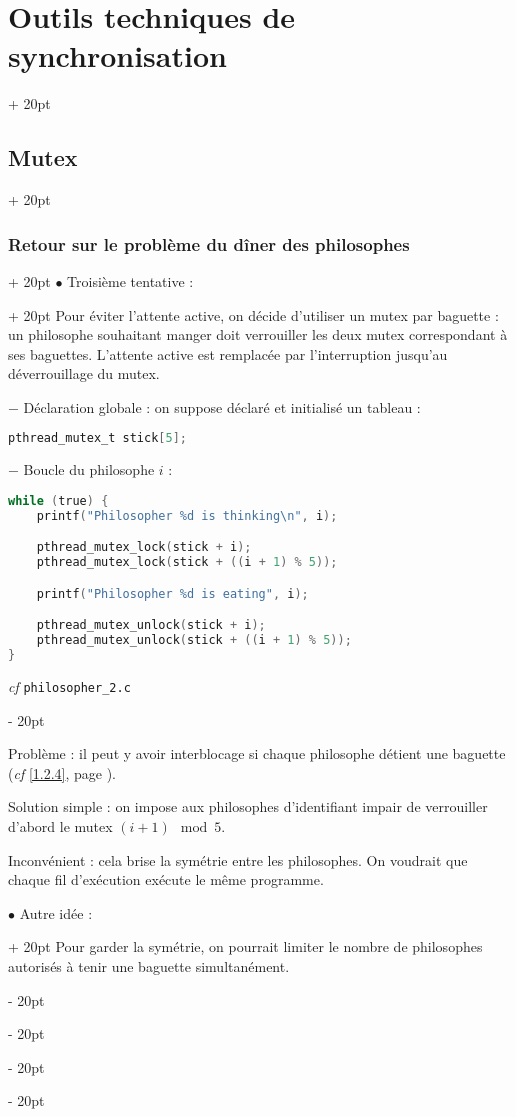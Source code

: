 \documentclass[a4paper, 12pt, twoside]{article}
\newcommand{\ind}[1][20pt]{\advance\leftskip + #1}
\newcommand{\deind}[1][20pt]{\advance\leftskip - #1}
\newenvironment{indt}[2][20pt]{#2 \par \ind[#1]}{\par \deind} %
\begin{document}
\begin{indt}{\section{Outils techniques de synchronisation}}
\begin{indt}{\subsection{Mutex}}
\begin{indt}{\subsubsection{Retour sur le problème du dîner des philosophes}}
                \begin{indt}{$\bullet$ Troisième tentative :}
                    Pour éviter l'attente active, on décide d'utiliser un mutex par baguette : un philosophe souhaitant manger doit verrouiller les deux mutex correspondant à ses baguettes.
                    L'attente active est remplacée par l'interruption jusqu'au déverrouillage du mutex.

                    $-$ Déclaration globale : on suppose déclaré et initialisé un tableau :

                    \begin{lstlisting}[language=C, xleftmargin=100pt]
pthread_mutex_t stick[5];\end{lstlisting}

                    $-$ Boucle du philosophe $i$ :

                    \begin{lstlisting}[language=C, xleftmargin=100pt]
while (true) {
    printf("Philosopher %d is thinking\n", i);

    pthread_mutex_lock(stick + i);
    pthread_mutex_lock(stick + ((i + 1) % 5));

    printf("Philosopher %d is eating", i);

    pthread_mutex_unlock(stick + i);
    pthread_mutex_unlock(stick + ((i + 1) % 5));
}\end{lstlisting}

                    \textit{cf} \texttt{philosopher\_2.c}
                \end{indt}

                \vspace{12pt}
                
                Problème : il peut y avoir interblocage si chaque philosophe détient une baguette (\textit{cf} \ref{1.2.4}, page \pageref{1.2.4}).

                \vspace{12pt}
                
                Solution simple : on impose aux philosophes d'identifiant impair de verrouiller d'abord le mutex $(i + 1) \mod 5$.

                Inconvénient : cela brise la symétrie entre les philosophes. On voudrait que chaque fil d'exécution exécute le même programme.

                \vspace{12pt}
                
                \begin{indt}{$\bullet$ Autre idée :}
                    Pour garder la symétrie, on pourrait limiter le nombre de philosophes autorisés à tenir une baguette simultanément.


\end{indt}
\end{indt}
\end{indt}
\end{indt}
\end{document}
